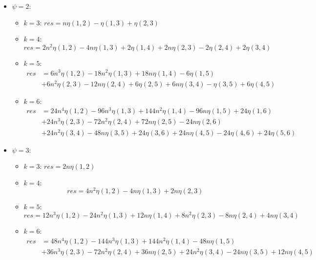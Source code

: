 \documentclass{article}
\begin{document}
\begin{itemize}
	\item $\psi = 2$:
    	\begin{itemize}[label=$\circ$]  %
    		\item $k = 3$: $res = n\eta(1,2) - \eta(1,3) + \eta(2,3)$
		
		\item $k = 4$: 
		\[
		res = 2n^2\eta(1,2) - 4n\eta(1,3) + 2\eta(1,4) + 2n\eta(2,3) - 2\eta(2,4) + 2\eta(3,4)
		\]
		
		\item $k = 5$: 
		\[
		\begin{aligned}
		res &= 6n^3\eta(1,2) - 18n^2\eta(1,3) + 18n\eta(1,4) - 6\eta(1,5)\\
		& + 6n^2\eta(2,3) - 12n\eta(2,4) + 6\eta(2,5) + 6n\eta(3,4) - \eta(3,5) + 6\eta(4,5)
		\end{aligned}
		\]
		
		\item $k = 6$: 
		\[
		\begin{aligned}
		res &= 24n^4\eta(1,2) - 96n^3\eta(1,3) + 144n^2\eta(1,4) - 96n\eta(1,5) + 24\eta(1,6)\\
		& + 24n^3\eta(2,3) - 72n^2\eta(2,4) + 72n\eta(2,5) - 24n\eta(2,6)\\
		& + 24n^2\eta(3,4) - 48n\eta(3,5) + 24\eta(3,6) + 24n\eta(4,5) - 24\eta(4,6) + 24\eta(5,6)
		\end{aligned}
		\]
    	\end{itemize}
    
    	\item $\psi = 3$:
    	\begin{itemize}[label=$\circ$]  %
    		\item $k = 3$: $res = 2n\eta(1,2)$
		\item $k = 4$: 
		\[
		res = 4n^2\eta(1,2) - 4n\eta(1,3) + 2n\eta(2,3)
		\]
		\item $k = 5$: 
		\[
		res = 12n^3\eta(1,2) - 24n^2\eta(1,3) + 12n\eta(1,4) + 8n^2\eta(2,3) - 8n\eta(2,4) + 4n\eta(3,4)
		\]
		\item $k = 6$: 
		\[
		\begin{aligned}
		res &= 48n^4\eta(1,2) - 144n^3\eta(1,3) + 144n^2\eta(1,4) - 48n\eta(1,5)\\
		& + 36n^3\eta(2,3) - 72n^2\eta(2,4) + 36n\eta(2,5) + 24n^2\eta(3,4) - 24n\eta(3,5) + 12n\eta(4,5)
		\end{aligned}
		\]
	\end{itemize}
	

\end{itemize}
\end{document}
